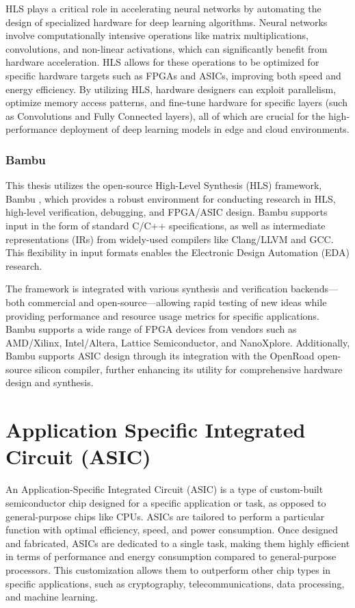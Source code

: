 HLS plays a critical role in accelerating neural networks by automating the design of specialized hardware for deep learning algorithms. Neural networks involve computationally intensive operations like matrix multiplications, convolutions, and non-linear activations, which can significantly benefit from hardware acceleration. HLS allows for these operations to be optimized for specific hardware targets such as FPGAs and ASICs, improving both speed and energy efficiency. By utilizing HLS, hardware designers can exploit parallelism, optimize memory access patterns, and fine-tune hardware for specific layers (such as Convolutions and Fully Connected layers), all of which are crucial for the high-performance deployment of deep learning models in edge and cloud environments.

\subsubsection{Bambu}

This thesis utilizes the open-source High-Level Synthesis (HLS) framework, Bambu \cite{ferrandi2021bambu}, which provides a robust environment for conducting research in HLS, high-level verification, debugging, and FPGA/ASIC design. Bambu supports input in the form of standard C/C++ specifications, as well as intermediate representations (IRs) from widely-used compilers like Clang/LLVM and GCC. This flexibility in input formats enables the Electronic Design Automation (EDA) research. 

The framework is integrated with various synthesis and verification backends—both commercial and open-source—allowing rapid testing of new ideas while providing performance and resource usage metrics for specific applications. Bambu supports a wide range of FPGA devices from vendors such as AMD/Xilinx, Intel/Altera, Lattice Semiconductor, and NanoXplore. Additionally, Bambu supports ASIC design through its integration with the OpenRoad open-source silicon compiler, further enhancing its utility for comprehensive hardware design and synthesis.

\section{Application Specific Integrated Circuit (ASIC)}

An Application-Specific Integrated Circuit (ASIC) is a type of custom-built semiconductor chip designed for a specific application or task, as opposed to general-purpose chips like CPUs. ASICs are tailored to perform a particular function with optimal efficiency, speed, and power consumption. Once designed and fabricated, ASICs are dedicated to a single task, making them highly efficient in terms of performance and energy consumption compared to general-purpose processors. This customization allows them to outperform other chip types in specific applications, such as cryptography, telecommunications, data processing, and machine learning.


